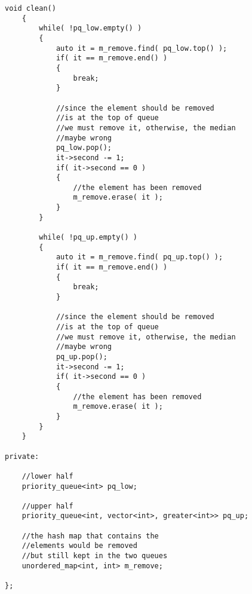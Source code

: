 \begin{lstlisting}[style=customc, caption={Using Two Heaps}]
    void clean()
    {
        while( !pq_low.empty() )
        {
            auto it = m_remove.find( pq_low.top() );
            if( it == m_remove.end() )
            {
                break;
            }

            //since the element should be removed
            //is at the top of queue
            //we must remove it, otherwise, the median
            //maybe wrong
            pq_low.pop();
            it->second -= 1;
            if( it->second == 0 )
            {
                //the element has been removed
                m_remove.erase( it );
            }
        }

        while( !pq_up.empty() )
        {
            auto it = m_remove.find( pq_up.top() );
            if( it == m_remove.end() )
            {
                break;
            }

            //since the element should be removed
            //is at the top of queue
            //we must remove it, otherwise, the median
            //maybe wrong
            pq_up.pop();
            it->second -= 1;
            if( it->second == 0 )
            {
                //the element has been removed
                m_remove.erase( it );
            }
        }
    }

private:

    //lower half
    priority_queue<int> pq_low;

    //upper half
    priority_queue<int, vector<int>, greater<int>> pq_up;

    //the hash map that contains the
    //elements would be removed
    //but still kept in the two queues
    unordered_map<int, int> m_remove;

};
\end{lstlisting}